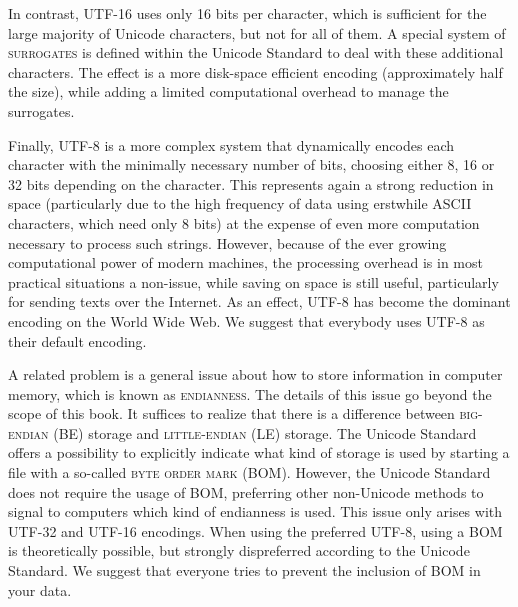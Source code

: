 In contrast, \textsc{UTF-16} uses only 16 bits per character, which is
sufficient for the large majority of Unicode characters, but not for all of
them. A special system of \textsc{surrogates} is defined within the Unicode
Standard to deal with these additional characters. The effect is a more
disk-space efficient encoding (approximately half the size), while adding a
limited computational overhead to manage the surrogates. 

Finally, \textsc{UTF-8} is a more complex system that dynamically encodes each
character with the minimally necessary number of bits, choosing either 8, 16 or
32 bits depending on the character. This represents again a strong reduction in
space (particularly due to the high frequency of data using erstwhile ASCII
characters, which need only 8 bits) at the expense of even more computation
necessary to process such strings. However, because of the ever growing
computational power of modern machines, the processing overhead is in most
practical situations a non-issue, while saving on space is still useful,
particularly for sending texts over the Internet. As an effect, UTF-8 has become
the dominant encoding on the World Wide Web. We suggest that everybody uses
UTF-8 as their default encoding.

A related problem is a general issue about how to store information in computer
memory, which is known as \textsc{endianness}. The details of this issue go
beyond the scope of this book. It suffices to realize that there is a difference
between \textsc{big-endian} (BE) storage and \textsc{little-endian} (LE)
storage. The Unicode Standard offers a possibility to explicitly indicate what
kind of storage is used by starting a file with a so-called \textsc{byte order
mark} (BOM). However, the Unicode Standard does not require the usage of BOM,
preferring other non-Unicode methods to signal to computers which kind of
endianness is used. This issue only arises with UTF-32 and UTF-16 encodings.
When using the preferred UTF-8, using a BOM is theoretically possible, but
strongly dispreferred according to the Unicode Standard. We suggest that
everyone tries to prevent the inclusion of BOM in your data.



